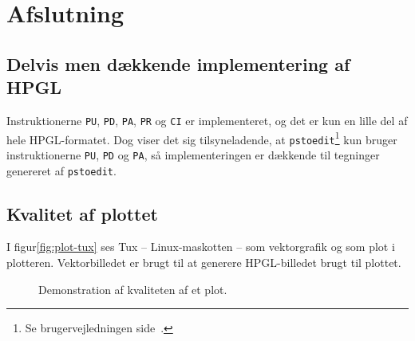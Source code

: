 \chapter{Afslutning}
\label{ch:afslutning}



\section{Delvis men dækkende implementering af HPGL}

Instruktionerne \texttt{PU}, \texttt{PD}, \texttt{PA}, \texttt{PR} og
\texttt{CI} er implementeret, og det er kun en lille del af hele
HPGL-formatet. Dog viser det sig tilsyneladende, at
\texttt{pstoedit}\footnote{Se brugervejledningen
  side~\pageref{ch:brugervejledning}.} kun bruger instruktionerne
\texttt{PU}, \texttt{PD} og \texttt{PA}, så implementeringen er
dækkende til tegninger genereret af \texttt{pstoedit}.


\section{Kvalitet af plottet}

I figur\vref{fig:plot-tux} ses Tux -- Linux-maskotten -- som
vektorgrafik og som plot i plotteren. Vektorbilledet er brugt til at
generere HPGL-billedet brugt til plottet.


\begin{figure}[htbp]
  \centering
  \qquad
  \caption{Demonstration af kvaliteten af et plot.}
  \label{fig:plot-tux}
\end{figure}


